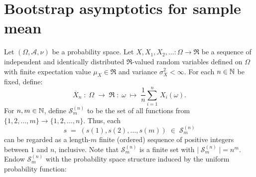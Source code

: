 

\section{Bootstrap asymptotics for sample mean}
\setcounter{theorem}{0}
\setcounter{equation}{0}

\newcommand{\Snm}{\mathcal{S}^{(n)}_{m}}
\newcommand{\Xnm}{\overline{X}^{(n)}_{m}}

\begin{theorem}
\mbox{}\vskip 0.1cm
\noindent
Let $\left(\Omega,\mathcal{A},\nu\right)$ be a probability space.
Let $X, X_{1}, X_{2}, \ldots : \Omega \longrightarrow \Re$ be a sequence
of independent and identically distributed $\Re$-valued random variables
defined on $\Omega$
{\color{red}with finite expectation value $\mu_{X} \in \Re$ and variance $\sigma^{2}_{X} < \infty$}.
For each $n \in \mathbb{N}$ be fixed, define:
\begin{equation*}
\overline{X}_{n} \;:\; \Omega \; \longrightarrow \; \Re \;:\; \omega \; \longmapsto \; \dfrac{1}{n}\sum^{n}_{i=1}\,X_{i}(\omega).
\end{equation*}
For $n, m \in \mathbb{N}$, define $\Snm$ to be the set of all functions from $\{1,2,\ldots,m\} \longrightarrow \{1,2,\ldots,n\}$.
Thus, each
\begin{equation*}
s \; = \; \left(s(1), s(2), \ldots, s(m) \right) \;\in\; \Snm
\end{equation*}
can be regarded as a length-$m$ finite (ordered) sequence of positive integers between $1$ and $n$, inclusive.
Note that $\Snm$ is a finite set with $\vert\;\Snm\;\vert = n^{m}$.
Endow $\Snm$ with the probability space structure induced by the uniform probability function:
\begin{equation*}

\end{equation*}
\end{theorem}
